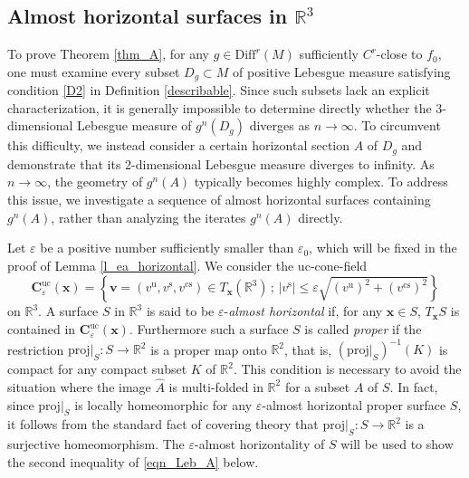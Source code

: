 \documentclass{amsart}
\theoremstyle{plain}
\theoremstyle{definition}
\theoremstyle{remark}
\numberwithin{equation}{section}
\def\bx{{\boldsymbol{x}}}
\begin{document}
\subsection{Almost horizontal surfaces in $\mathbb{R}^3$}
To prove Theorem \ref{thm_A}, for any $g \in \mathrm{Diff}^r(M)$ sufficiently $C^r$-close to $f_0$, one must examine every subset $D_g \subset M$ of positive Lebesgue measure satisfying condition \eqref{D2} in Definition \ref{describable}.
Since such subsets lack an explicit characterization, it is generally impossible to determine directly whether the 3-dimensional Lebesgue measure of $g^n(D_g)$ diverges as $n \to \infty$. 
To circumvent this difficulty, we instead consider a certain horizontal section $A$ of $D_g$ and demonstrate that its 2-dimensional Lebesgue measure diverges to infinity. 
As $n \to \infty$, the geometry of $g^n(A)$ typically becomes highly complex. 
To address this issue, we investigate a sequence of almost horizontal surfaces containing $g^n(A)$, rather than analyzing the iterates $g^n(A)$ directly.




Let $\varepsilon$ be a positive number sufficiently smaller than $\varepsilon_0$, which will be 
fixed in the proof of Lemma \ref{l_ea_horizontal}.
We consider the $\mathrm{uc}$-cone-field 
\[
\boldsymbol{C}_{\varepsilon}^{\mathrm{uc}}(\boldsymbol{x})=
\left\{
\boldsymbol{v}=(v^{\mathrm{u}},v^{\mathrm{s}},v^{\mathrm{cs}})\in T_{\boldsymbol{x}}(\mathbb{R}^3)\,;\,
|v^{\mathrm{s}}|\leq\varepsilon\sqrt{(v^{\mathrm{u}})^2+(v^{\mathrm{cs}})^2}
\right\}
\]
on $\mathbb{R}^3$.
A surface $S$ in $\mathbb{R}^3$ is said to be $\varepsilon$-\emph{almost horizontal} if, for any 
$\bx\in S$, $T_{\bx}S$ is contained in $\boldsymbol{C}_{\varepsilon}^{\mathrm{uc}}(\bx)$.
Furthermore such a surface $S$ is called \emph{proper} 
if the restriction $\mathrm{proj}|_S:S\longrightarrow \mathbb{R}^2$ is a proper map onto $\mathbb{R}^2$, that is, 
$(\mathrm{proj}|_S)^{-1}(K)$ is compact for any compact subset $K$ of $\mathbb{R}^2$.
This condition is necessary to avoid the situation where the image $\widehat A$ is multi-folded in $\mathbb{R}^2$ for a subset $A$ of $S$.
In fact, since $\mathrm{proj}|_S$ is locally homeomorphic for any $\varepsilon$-almost horizontal proper surface $S$,  it follows from the standard fact of 
covering theory that $\mathrm{proj}|_S:S\longrightarrow \mathbb{R}^2$ is a surjective homeomorphism.
The $\varepsilon$-almost horizontality of $S$ will be used to show the second inequality of \eqref{eqn_Leb_A} below.
\end{document}
